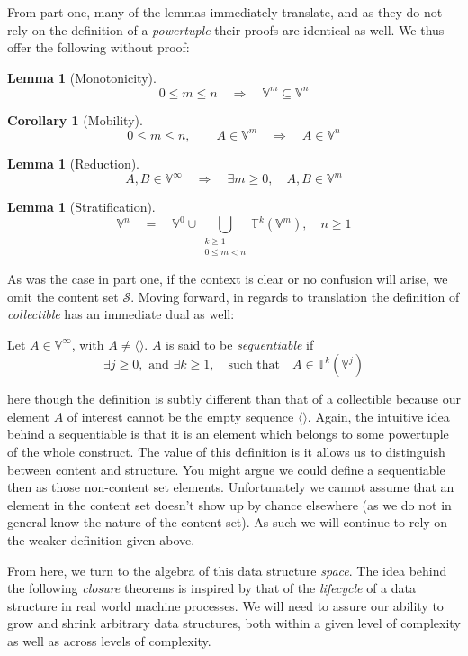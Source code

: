 \documentclass[twoside]{article}
\newcommand{\nthpt}[2][T]{\ensuremath{\mathbb{#1}^{#2}}}
\newcommand{\nthut}[2][V]{\ensuremath{\mathbb{#1}^{#2}}}
\newcommand{\restratified}{\ensuremath{\mathbb{V}^\infty}}
\newcommand{\then}{\ensuremath{\quad\Longrightarrow\quad}}
\newcommand{\equals}{\ensuremath{\quad =\quad}}
\newtheorem{lemma}[theorem]{Lemma}
\newtheorem{corollary}[theorem]{Corollary}
\newenvironment{definition}[1][Definition]{\begin{trivlist}
\item[\hskip \labelsep {\bfseries #1:}]}{\end{trivlist}}
\begin{document}
From part one, many of the lemmas immediately translate, and as they do not rely on the definition of a \emph{powertuple}
their proofs are identical as well. We thus offer the following without proof:

\begin{lemma}[Monotonicity]
$$ 0\le m\le n\then\nthut{m}\subseteq\nthut{n} $$
\end{lemma}

\begin{corollary}[Mobility]
$$ 0\le m\le n,\qquad A\in\nthut{m}\then A\in\nthut{n} $$
\end{corollary}

\begin{lemma}[Reduction]
$$ A,B\in\restratified\then\exists m\ge 0,\quad A,B\in\nthut{m} $$
\end{lemma}

\begin{lemma}[Stratification]
$$ \nthut{n}\equals\nthut{0}\cup\bigcup_{\substack{k\ge 1 \\ 0\le m < n}}\nthpt{k}(\nthut{m}),\quad n\ge 1 $$
\end{lemma}
As was the case in part one, if the context is clear or no confusion will arise, we omit the content set $ \mathcal{S} $.
Moving forward, in regards to translation the definition of \emph{collectible} has an immediate dual as well:

\begin{definition}[Sequentiable]
Let $ A\in\restratified $, with $ A\neq\langle\rangle $. $ A $ is said to be \emph{sequentiable} if
$$ \exists j\ge 0, \mbox{ and }\exists k\ge 1,\quad\mbox{such that}\quad A\in\nthpt{k}(\nthut{j}) $$
\end{definition}
here though the definition is subtly different than that of a collectible because our element $ A $ of interest
cannot be the empty sequence $ \langle\rangle $. Again, the intuitive idea behind a sequentiable is that it is
an element which belongs to some powertuple of the whole construct. The value of this definition is it allows
us to distinguish between content and structure. You might argue we could define a sequentiable then as those
non-content set elements. Unfortunately we cannot assume that an element in the content set doesn't show up by
chance elsewhere (as we do not in general know the nature of the content set). As such we will continue to rely
on the weaker definition given above.

From here, we turn to the algebra of this data structure \emph{space}. The idea behind the following \emph{closure}
theorems is inspired by that of the \emph{lifecycle} of a data structure in real world machine processes.
We will need to assure our ability to grow and shrink arbitrary data structures, both within a given level of complexity
as well as across levels of complexity.
\end{document}
